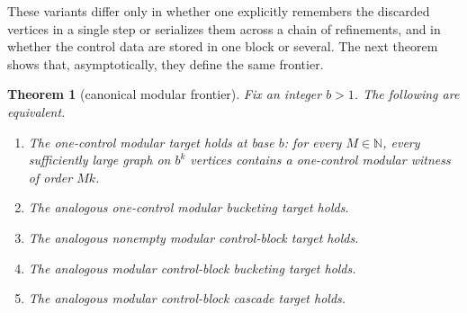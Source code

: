 \documentclass[11pt]{amsart}
\newtheorem{theorem}{Theorem}[section]
\theoremstyle{definition}
\newcommand{\N}{\mathbb{N}}
\begin{document}
These variants differ only in whether one explicitly remembers the discarded vertices in a single
step or serializes them across a chain of refinements, and in whether the control data are stored in
one block or several. The next theorem shows that, asymptotically, they define the same frontier.

\begin{theorem}[canonical modular frontier]\label{thm:canonical-frontier}
Fix an integer $b>1$. The following are equivalent.
\begin{enumerate}
  \item The one-control modular target holds at base $b$: for every $M \in \N$, every sufficiently
    large graph on $b^k$ vertices contains a one-control modular witness of order $Mk$.
  \item The analogous one-control modular bucketing target holds.
  \item The analogous nonempty modular control-block target holds.
  \item The analogous modular control-block bucketing target holds.
  \item The analogous modular control-block cascade target holds.
\end{enumerate}
\end{theorem}
\end{document}
